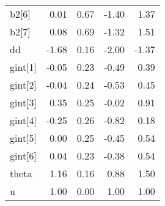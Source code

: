 \documentclass[12pt,]{article}
\begin{document}
\begin{table}[ht]
{\begin{tabular}{lrrrr}
  b2[6] & 0.01 & 0.67 & -1.40 & 1.37 \\ 
  b2[7] & 0.08 & 0.69 & -1.32 & 1.51 \\ 
  dd & -1.68 & 0.16 & -2.00 & -1.37 \\ 
  gint[1] & -0.05 & 0.23 & -0.49 & 0.39 \\ 
  gint[2] & -0.04 & 0.24 & -0.53 & 0.45 \\ 
  gint[3] & 0.35 & 0.25 & -0.02 & 0.91 \\ 
  gint[4] & -0.25 & 0.26 & -0.82 & 0.18 \\ 
  gint[5] & 0.00 & 0.25 & -0.45 & 0.54 \\ 
  gint[6] & 0.04 & 0.23 & -0.38 & 0.54 \\ 
  theta & 1.16 & 0.16 & 0.88 & 1.50 \\ 
  u & 1.00 & 0.00 & 1.00 & 1.00 \\ 
   \hline
\end{tabular}
}
\end{table}
\end{document}
